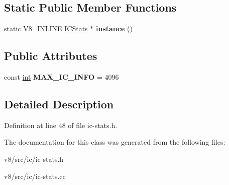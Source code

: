 \subsection*{Static Public Member Functions}
\begin{DoxyCompactItemize}
\item 
\mbox{\label{classv8_1_1internal_1_1ICStats_a06d0c1b00fa12e01079aaa035296d001}} 
static V8\+\_\+\+I\+N\+L\+I\+NE \mbox{\hyperlink{classv8_1_1internal_1_1ICStats}{I\+C\+Stats}} $\ast$ {\bfseries instance} ()
\end{DoxyCompactItemize}
\subsection*{Public Attributes}
\begin{DoxyCompactItemize}
\item 
\mbox{\label{classv8_1_1internal_1_1ICStats_abbea8018d6f1795d9f4645c4979dbc55}} 
const \mbox{\hyperlink{classint}{int}} {\bfseries M\+A\+X\+\_\+\+I\+C\+\_\+\+I\+N\+FO} = 4096
\end{DoxyCompactItemize}


\subsection{Detailed Description}


Definition at line 48 of file ic-\/stats.\+h.



The documentation for this class was generated from the following files\+:\begin{DoxyCompactItemize}
\item 
v8/src/ic/ic-\/stats.\+h\item 
v8/src/ic/ic-\/stats.\+cc\end{DoxyCompactItemize}
